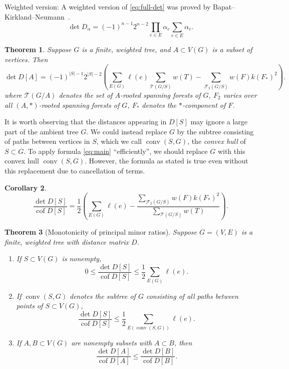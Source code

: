 \documentclass{amsart}
\newtheorem{thm}{Theorem}
\newtheorem{cor}[thm]{Corollary}
\theoremstyle{definition}
\DeclareMathOperator{\cof}{cof}
\DeclareMathOperator{\conv}{conv}
\newcommand{\trees}{\mathcal{T}}
\newcommand{\forests}{\mathcal{F}}
\begin{document}
Weighted version:
A weighted version of \eqref{eq:full-det} was proved by Bapat--Kirkland--Neumann~\cite{bapat-kirkland-neumann}.
\begin{equation}\label{eq:w-full-det}
\det D_{\alpha} = (-1)^{n-1} 2^{n-2} \prod_{e \in E} \alpha_e \sum_{e \in E} \alpha_e .
\end{equation}
\begin{thm}
\label{thm:w-main}
Suppose $G$ is a finite, weighted tree, and $A \subset V(G)$ is a subset of vertices.
Then
\begin{equation}\label{eq:w-main}
\det D[A] = (-1)^{|S|-1} 2^{|S|-2} \left( \sum_{E(G)}\ell(e) \sum_{\trees(G/S)} w(T) - \sum_{\forests_2(G/S)} w(F) k(F_{*})^2 \right).
\end{equation}
where 
$\mathcal T(G/A)$ denotes the set of $A$-rooted spanning forests of $G$,
$F_2$ varies over all $(A,*)$-rooted spanning forests of $G$,
$F_{*}$ denotes the $*$-component of $F$.
\end{thm}

It is worth observing that the distances appearing in $D[S]$ may ignore a large part of the ambient tree $G$.
We could instead replace $G$ by the subtree consisting of paths between vertices in $S$,
which we call $\conv(S,G)$, the {\em convex hull} of $S \subset G$.
To apply formula \eqref{eq:main} ``efficiently'', 
we should replace $G$ with this convex hull $\conv(S,G)$.
However, the formula as stated is true even without this replacement due to cancellation of terms.

\begin{cor}
\begin{equation}
\frac{\det D[S]}{\cof D[S]} = \frac12 \left( \sum_{E(G)} \ell(e) - \frac{\sum_{\forests_2(G/S)} w(F) k(F_*)^2}{\sum_{\trees(G/S)} w(T)} \right) .
\end{equation}
\end{cor}

\begin{thm}[Monotonicity of principal minor ratios]
Suppose $G = (V,E)$ is a finite, weighted tree with distance matrix $D$.
\begin{enumerate}
\item 
If $S \subset V(G)$ is nonempty,
\begin{equation*}
0 \leq \frac{\det D[S]}{\cof D[S]} \leq \frac12 \sum_{E(G)} \ell(e) .
\end{equation*}

\item 
If $\conv(S,G)$ denotes the subtree of $G$ consisting of all paths between points of $S \subset V(G)$,
\begin{equation*}
 \frac{\det D[S]}{\cof D[S]} \leq \frac12 \sum_{E(\conv(S, G))} \ell(e) .
\end{equation*}

\item 
If $A,B \subset V(G)$
are nonempty subsets with
$A \subset B$,
then
\begin{equation*}
 \frac{\det D[A]}{\cof D[A]}  \leq \frac{\det D[B]}{\cof D[B]}  .
\end{equation*}
\end{enumerate}
\end{thm}
\end{document}
